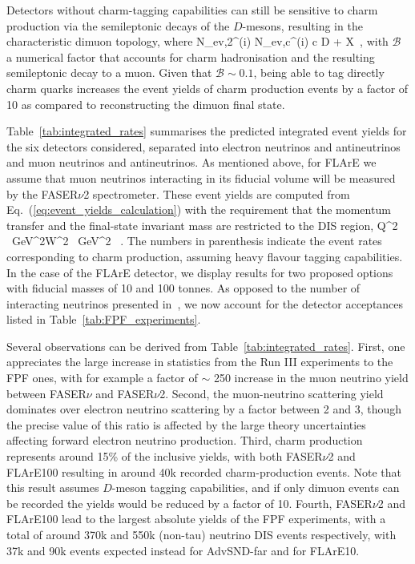   Detectors without charm-tagging capabilities can still be sensitive to charm production via
  the semileptonic decays of the $D$-mesons, resulting in the characteristic
  dimuon topology, where
  \be
 N_{\rm ev,2\mu}^{(i)} \approx N_{\rm ev,c}^{(i)} \times {}\lp c \to D \to \mu + X\rp \, ,
 \ee
 with $\mathcal{B}$ a numerical factor that accounts for charm hadronisation and the
 resulting semileptonic decay to a muon.
 Given that $\mathcal{B}\sim 0.1$, being able to tag directly charm quarks increases the event yields
 of charm production events by a factor of 10 as compared to reconstructing the dimuon final state.

 Table~\ref{tab:integrated_rates} summarises the predicted integrated event yields for the six
 detectors
considered, separated into electron neutrinos and antineutrinos
and muon neutrinos and antineutrinos.
%
As mentioned above, for FLArE we assume that muon neutrinos interacting
in its fiducial volume will be measured
by the FASER$\nu$2 spectrometer.
These event yields are computed from Eq.~(\ref{eq:event_yields_calculation}) with the
requirement that the momentum transfer and the final-state invariant mass are restricted
to the DIS region,
\be
\label{eq:DISconditions}
Q^2 ~{\rm GeV}^2\quad  W^2 ~{\rm GeV}^2 \, .
\ee
%
The numbers in parenthesis indicate the event rates corresponding to charm
production, assuming heavy flavour tagging capabilities.
%
In the case of the FLArE detector, we display results for two proposed options with fiducial
masses of 10 and 100 tonnes.
%
As opposed to the number of interacting neutrinos presented
in~\cite{Feng:2022inv}, we now account for the
detector acceptances listed in  Table~\ref{tab:FPF_experiments}. 



Several observations can be derived from Table~\ref{tab:integrated_rates}.
%
First, one appreciates the large increase in statistics from
the Run III experiments to the FPF ones, with for example a factor of
$\sim$ 250 increase in the muon neutrino yield between FASER$\nu$ and
FASER$\nu$2.
%
Second, the muon-neutrino scattering yield dominates over electron neutrino scattering by a factor
between 2 and 3, though the precise value of this ratio is affected by the large theory uncertainties
affecting forward electron neutrino production.
%
Third, charm production  represents around 15\% of the inclusive
yields, with both FASER$\nu$2 and FLArE100 resulting in around
40k recorded charm-production events.
%
Note that this result assumes $D$-meson tagging capabilities,
and if only dimuon events can be recorded
the yields would be reduced by a factor of 10.
%
Fourth, FASER$\nu$2 and FLArE100 lead to the largest absolute
yields of the FPF experiments, with a total of around 370k and 550k (non-tau) neutrino DIS events respectively, with 37k and 90k
events expected instead for AdvSND-far and for FLArE10.

